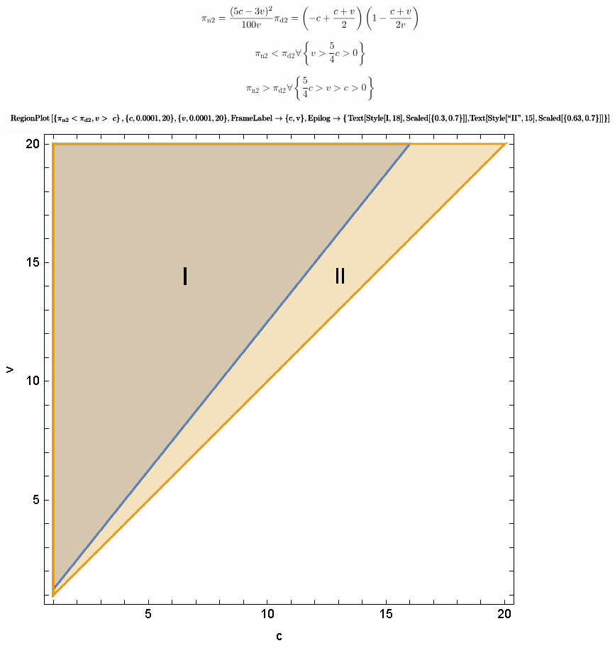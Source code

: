\documentclass{article}
\begin{document}
\[\pi _{\text{n2}}=\frac{(5 c-3 v)^2}{100 v}\\
\\
\pi _{\text{d2}}=\left(-c+\frac{c+v}{2}\right) \left(1-\frac{c+v}{2 v}\right)\]

\begin{equation}
\pi _{\text{n2}}<\pi _{\text{d2}} \forall \left\{v > \frac{5}{4}c > 0\right\}
\end{equation}

\begin{equation}
\pi _{\text{n2}}>\pi _{\text{d2}} \forall \left\{\frac{5}{4}c>v > c > 0\right\}
\end{equation}

\begin{doublespace}
\noindent\(\pmb{\text{RegionPlot}\left[\left\{\pi _{\text{n2}}<\pi _{\text{d2}} ,v >\text{  }c\right\},\{c,0.0001,20\},\{v,0.0001,20\},\text{FrameLabel}\to
\{\text{c},\text{v}\},\text{Epilog}\to \{\right.}\\
\pmb{\text{Text}[\text{Style}[\text{I},18],\text{Scaled}[\{0.3,0.7\}]],}\\
\pmb{\text{Text}[\text{Style}[\text{{``}II{''}},15],\text{Scaled}[\{0.63,0.7\}]]\}]}\)
\end{doublespace}

\includegraphics{2020_05_19-overleaf-mirror_gr2.eps}
\end{document}
